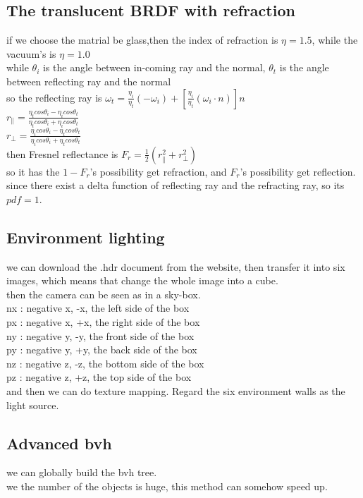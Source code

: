 \documentclass[acmtog]{acmart}
\begin{document}
\subsection{The translucent BRDF with refraction}
if we choose the matrial be glass,then the index of refraction is $\eta = 1.5$, while the vacuum's is $\eta = 1.0$\\
while $\theta_i$ is the angle between in-coming ray and the normal, $\theta_t$ is the angle between reflecting ray and the normal\\
so the reflecting ray is $\omega_t = \frac{\eta_i}{\eta_t}(-\omega_i)+[\frac{\eta_i}{\eta_t}(\omega_i\cdot n)]n$\\
$r_\parallel=\frac{\eta_tcos\theta_i-\eta_icos\theta_t}{\eta_tcos\theta_i+\eta_icos\theta_t}$\\
$r_\perp=\frac{\eta_icos\theta_i-\eta_tcos\theta_t}{\eta_icos\theta_i+\eta_tcos\theta_t}$\\
then Fresnel reflectance is $F_r = \frac{1}{2}(r_\parallel^2+r_\perp^2)$\\
so it has the $1 - F_r$'s possibility get refraction, and $F_r$'s possibility get reflection.
since there exist a delta function of reflecting ray and the refracting ray, so its $pdf = 1$.\\

\subsection{Environment lighting}
we can download the .hdr document from the website, then transfer it into six images,
which means that change the whole image into a cube.\\
then the camera can be seen as in a sky-box.\\
nx : negative x, -x, the left side of the box\\
px : negative x, +x, the right side of the box\\
ny : negative y, -y, the front side of the box\\
py : negative y, +y, the back side of the box\\
nz : negative z, -z, the bottom side of the box\\
pz : negative z, +z, the top side of the box\\
and then we can do texture mapping. Regard the six environment walls as the light source.\\

\subsection{Advanced bvh}
we can globally build the bvh tree.\\
we the number of the objects is huge, this method can somehow speed up.\\
\end{document}
